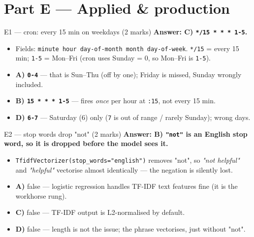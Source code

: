 \documentclass[aspectratio=169,11pt]{beamer}
\begin{document}
\section{Part E --- Applied \& production}

\begin{frame}[fragile]{E1 --- cron: every 15 min on weekdays (2 marks)}
\textbf{Answer: C) \texttt{*/15 * * * 1-5}.}
\begin{itemize}
  \item Fields: \texttt{minute hour day-of-month month day-of-week}.
        \texttt{*/15} = every 15 min; \texttt{1-5} = Mon--Fri (cron uses
        \textcolor{cgreen}{Sunday = 0}, so Mon--Fri is \texttt{1-5}).
  \item \textbf{A) \texttt{0-4}} --- that is Sun--Thu (off by one); Friday is missed, Sunday wrongly included.
  \item \textbf{B) \texttt{15 * * * 1-5}} --- fires \emph{once} per hour at \texttt{:15}, not every 15 min.
  \item \textbf{D) \texttt{6-7}} --- Saturday (6) only (\texttt{7} is out of range / rarely Sunday); wrong days.
\end{itemize}
\end{frame}

\begin{frame}{E2 --- stop words drop "not" (2 marks)}
\textbf{Answer: B) \texttt{"not"} is an English stop word, so it is dropped before the model sees it.}
\begin{itemize}
  \item \texttt{TfidfVectorizer(stop\_words="english")} \textcolor{cred}{removes "not"}, so
        \emph{"not helpful"} and \emph{"helpful"} vectorise almost identically --- the negation is
        silently lost.
  \item \textbf{A)} false --- logistic regression handles TF-IDF text features fine (it is the workhorse rung).
  \item \textbf{C)} false --- TF-IDF output is L2-normalised by default.
  \item \textbf{D)} false --- length is not the issue; the phrase vectorises, just without "not".
\end{itemize}
\end{frame}
\end{document}
